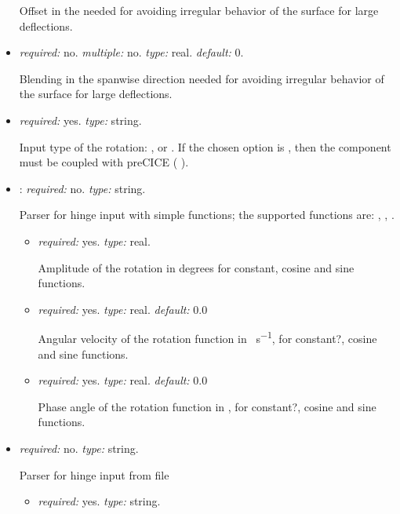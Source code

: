 \begin{itemize}
    Offset in the  needed for avoiding irregular behavior of the surface for large deflections.

    \item {} \textit{required:} no. \textit{multiple:} no. \textit{type:} real. \textit{default:} 0.
    
    Blending in the spanwise direction needed for avoiding irregular behavior of the surface for large deflections.
    
    \item {}
    \textit{required:} yes. \textit{type:} string.
    
    Input type of the rotation: ,  or . If the chosen option is , then the component must be coupled with preCICE ( ).
    
    \item {}: \textit{required:} no. \textit{type:} string. 
    
    Parser for hinge input with simple functions; the supported functions are: , , . 
    \begin{itemize}
        \item {} \textit{required:} yes. \textit{type:} real. 
        
        Amplitude of the rotation in degrees for constant, cosine and sine functions. 
        
        \item {} \textit{required:} yes. \textit{type:} real. \textit{default:} 0.0 
        
        Angular velocity of the rotation function in \si{\deg\per\second}, for constant?, cosine and sine functions.
        
        \item {} \textit{required:} yes. \textit{type:} real. \textit{default:} 0.0
        
        Phase angle of the rotation function in \si{\deg}, for constant?, cosine and sine functions.
    \end{itemize}
    \item {} \textit{required:} no. \textit{type:} string. 
    
    Parser for hinge input from file
    
    \begin{itemize}
        \item {} \textit{required:} yes. \textit{type:} string. 
        

\end{itemize}
\end{itemize}
